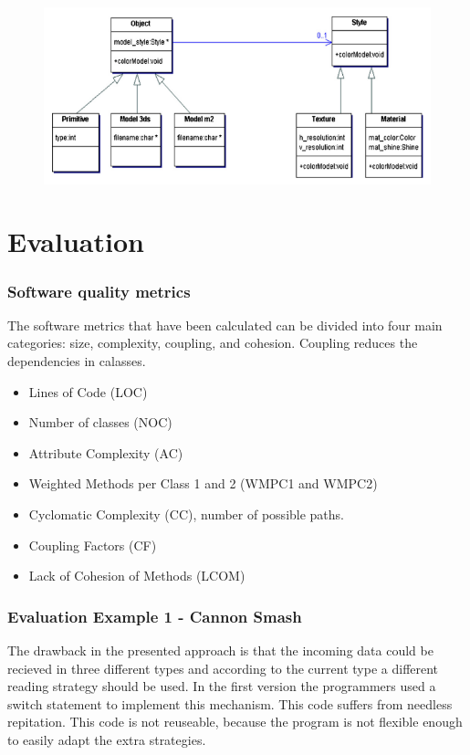       \begin{figure}[H]
        \includegraphics[width=\textwidth]{pics/bridgepattern.png}
      \end{figure}

  \section*{Evaluation}

    \subsubsection*{Software quality metrics}
    The software metrics that have been calculated can be divided into four main categories: size, complexity, coupling, and cohesion. 
    Coupling reduces the dependencies in calasses. 

      \begin{itemize}
        \item Lines of Code (LOC)
        \item Number of classes (NOC)
        \item Attribute Complexity (AC)
        \item Weighted Methods per Class 1 and 2 (WMPC1 and WMPC2)
        \item Cyclomatic Complexity (CC), number of possible paths.
        \item Coupling Factors (CF)
        \item Lack of Cohesion of Methods (LCOM)
      \end{itemize}

    \subsubsection*{Evaluation Example 1 - Cannon Smash}
    The drawback in the presented approach is that the incoming data could be recieved in three different types and according to the current type a different reading strategy should be used. In the first version the programmers used a switch statement to implement this mechanism. This code suffers from needless repitation. This code is not reuseable, because the program is not flexible enough to easily adapt the extra strategies. 

